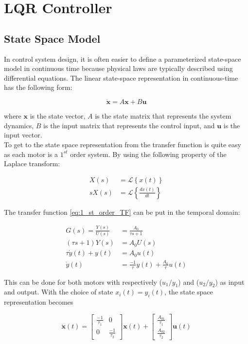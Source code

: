 \chapter{LQR Controller}

\section{State Space Model}
In control system design, it is often easier to define a parameterized state-space model in continuous time because 
physical laws are typically described using differential equations. The linear state-space representation in 
continuous-time has the following form:

\begin{equation}
    \dot{\mathbf{x}} = A \mathbf{x} + B \mathbf{u}
    \label{eq:state_space_models}
\end{equation}

where \( \mathbf{x} \) is the state vector, \( A \) is the state matrix that represents the system dynamics, 
\( B \) is the input matrix that represents the control input, and \( \mathbf{u} \) is the input vector.\\
To get to the state space representation from the transfer function is quite easy as each motor is a $1^{st}$ order
system. By using the following property of the Laplace transform:

\begin{align}
    X(s) &= \mathcal{L}\left\{x(t)\right\}\\
    s X(s) &= \mathcal{L}\left\{\frac{d x(t)}{dt}\right\}
\end{align}

The transfer function \ref{eq:1_st_order_TF} can be put in the temporal domain:

\begin{align}
    G(s) = \frac{Y(s)}{U(s)} &= \frac{A_0}{\tau s + 1}\\
    \left(\tau s + 1\right) Y(s) &= A_0 U(s)\\
    \tau \dot{y}(t) + y(t) &= A_0 u(t)\\
    \dot{y}(t) &= \frac{-1}{\tau} y(t) + \frac{A_0}{\tau} u(t)
\end{align}

This can be done for both motors with respectively ($u_1/y_1$) and ($u_2/y_2$) as input and output. With the choice of 
state $x_i(t) = y_i(t)$, the state space representation becomes

\begin{equation}
    \dot{\mathbf{x}}(t) = \begin{bmatrix}
    \frac{-1}{\tau_1} & 0 \\ 
    0 & \frac{-1}{\tau_2}
    \end{bmatrix} \mathbf{x}(t) + \begin{bmatrix} 
    \frac{A_{01}}{\tau_1} \\ 
    \frac{A_{02}}{\tau_2} 
    \end{bmatrix}\mathbf{u}(t)
    \label{eq:state_space_model_cx}
\end{equation}

